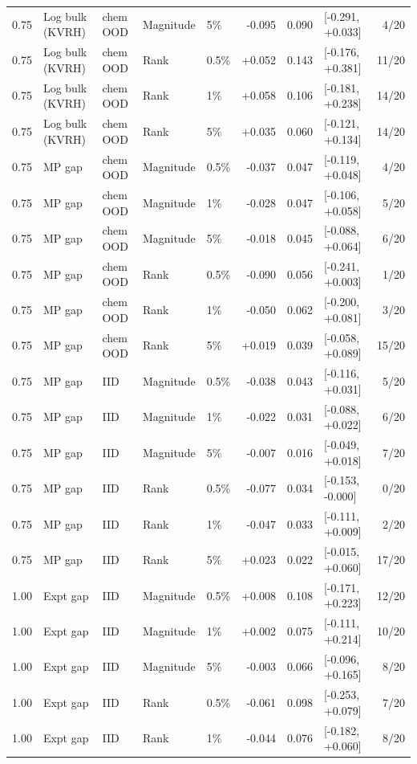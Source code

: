 \begin{longtable}{@{}lllllrrlr@{}}
0.75 & Log bulk (KVRH) & chem OOD & Magnitude & 5\% & -0.095 & 0.090 & [-0.291, +0.033] & 4/20 \\
0.75 & Log bulk (KVRH) & chem OOD & Rank & 0.5\% & +0.052 & 0.143 & [-0.176, +0.381] & 11/20 \\
0.75 & Log bulk (KVRH) & chem OOD & Rank & 1\% & +0.058 & 0.106 & [-0.181, +0.238] & 14/20 \\
0.75 & Log bulk (KVRH) & chem OOD & Rank & 5\% & +0.035 & 0.060 & [-0.121, +0.134] & 14/20 \\
0.75 & MP gap & chem OOD & Magnitude & 0.5\% & -0.037 & 0.047 & [-0.119, +0.048] & 4/20 \\
0.75 & MP gap & chem OOD & Magnitude & 1\% & -0.028 & 0.047 & [-0.106, +0.058] & 5/20 \\
0.75 & MP gap & chem OOD & Magnitude & 5\% & -0.018 & 0.045 & [-0.088, +0.064] & 6/20 \\
0.75 & MP gap & chem OOD & Rank & 0.5\% & -0.090 & 0.056 & [-0.241, +0.003] & 1/20 \\
0.75 & MP gap & chem OOD & Rank & 1\% & -0.050 & 0.062 & [-0.200, +0.081] & 3/20 \\
0.75 & MP gap & chem OOD & Rank & 5\% & +0.019 & 0.039 & [-0.058, +0.089] & 15/20 \\
0.75 & MP gap & IID & Magnitude & 0.5\% & -0.038 & 0.043 & [-0.116, +0.031] & 5/20 \\
0.75 & MP gap & IID & Magnitude & 1\% & -0.022 & 0.031 & [-0.088, +0.022] & 6/20 \\
0.75 & MP gap & IID & Magnitude & 5\% & -0.007 & 0.016 & [-0.049, +0.018] & 7/20 \\
0.75 & MP gap & IID & Rank & 0.5\% & -0.077 & 0.034 & [-0.153, -0.000] & 0/20 \\
0.75 & MP gap & IID & Rank & 1\% & -0.047 & 0.033 & [-0.111, +0.009] & 2/20 \\
0.75 & MP gap & IID & Rank & 5\% & +0.023 & 0.022 & [-0.015, +0.060] & 17/20 \\
1.00 & Expt gap & IID & Magnitude & 0.5\% & +0.008 & 0.108 & [-0.171, +0.223] & 12/20 \\
1.00 & Expt gap & IID & Magnitude & 1\% & +0.002 & 0.075 & [-0.111, +0.214] & 10/20 \\
1.00 & Expt gap & IID & Magnitude & 5\% & -0.003 & 0.066 & [-0.096, +0.165] & 8/20 \\
1.00 & Expt gap & IID & Rank & 0.5\% & -0.061 & 0.098 & [-0.253, +0.079] & 7/20 \\
1.00 & Expt gap & IID & Rank & 1\% & -0.044 & 0.076 & [-0.182, +0.060] & 8/20 \\

\end{longtable}

